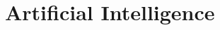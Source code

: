 \documentclass[../dolphin-book-2023.tex]{subfiles}
\begin{document}
\chapter{Artificial Intelligence}


\end{document}
